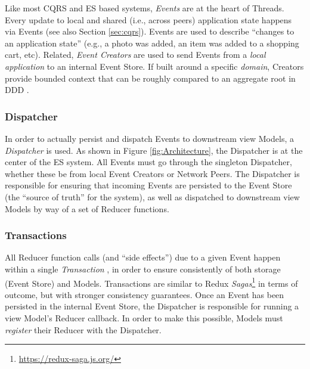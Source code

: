 \documentclass{textile}
\begin{document}
Like most CQRS and ES based systems, \emph{Events} are at the heart of Threads. Every update to local and shared (i.e., across peers) application state happens via Events (see also Section \ref{sec:cqrs}). Events are used to describe ``changes to an application state'' \cite{fowlerEventSourcing} (e.g., a photo was added, an item was added to a shopping cart, etc). Related, \emph{Event Creators} are used to send Events from a \emph{local application} to an internal Event Store. If built around a specific \emph{domain}, Creators provide bounded context that can be roughly compared to an aggregate root in DDD \cite{evansDomaindrivenDesignTackling2004a}.

\subsubsection{Dispatcher}\label{sec:dispatcher}

In order to actually persist and dispatch Events to downstream view Models, a \emph{Dispatcher} is used. As shown in Figure \ref{fig:Architecture}, the Dispatcher is at the center of the ES system. All Events must go through the singleton Dispatcher, whether these be from local Event Creators or Network Peers. The Dispatcher is responsible for ensuring that incoming Events are persisted to the Event Store (the ``source of truth'' for the system), as well as dispatched to downstream view Models by way of a set of Reducer functions.


\subsubsection{Transactions}\label{sec:transactions}

All Reducer function calls (and ``side effects'') due to a given Event happen within a single \emph{Transaction} \cite{haerderPrinciplesTransactionorientedDatabase1983}, in order to ensure consistently of both storage (Event Store) and Models. Transactions are similar to Redux \emph{Sagas}\footnote{\url{https://redux-saga.js.org/}} in terms of outcome, but with stronger consistency guarantees. Once an Event has been persisted in the internal Event Store, the Dispatcher is responsible for running a view Model's Reducer callback. In order to make this possible, Models must \emph{register} their Reducer with the Dispatcher.
\end{document}

